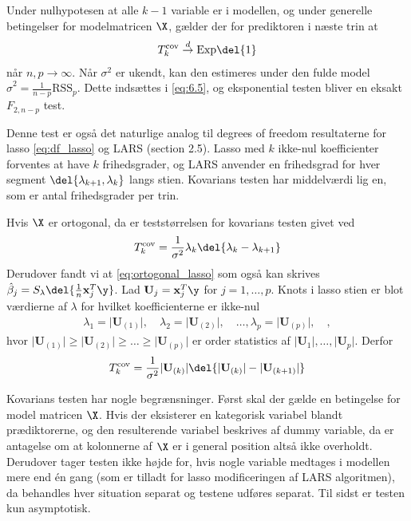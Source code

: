 Under nulhypotesen at alle $k-1$ variable er i modellen, og under generelle betingelser for modelmatricen $\X$, gælder der for prediktoren i næste trin at
\begin{align*}
T_k^\text{cov} \overset{d}{\rightarrow} \text{Exp}\del{1}
\end{align*}
når \(n, p \rightarrow \infty\).
Når \(\sigma^2\) er ukendt, kan den estimeres under den fulde model \(\hat{\sigma}^2 = \frac{1}{n-p} \text{RSS}_p\). 
Dette indsættes i \eqref{eq:6.5}, og eksponential testen bliver en eksakt \(F_{2,n-p}\) test.

Denne test er også det naturlige analog til degrees of freedom resultaterne for lasso \eqref{eq:df_lasso} og LARS (section 2.5).
Lasso med \(k\) ikke-nul koefficienter forventes at have \(k\) frihedsgrader, og LARS anvender en frihedsgrad for hver segment \(\del{\lambda_{k+1}, \lambda_k}\) langs stien.
Kovarians testen har middelværdi lig en, som er antal frihedsgrader per trin.


Hvis \(\X\) er ortogonal, da er teststørrelsen for kovarians testen givet ved
\begin{align*}
T_k^\text{cov} = \frac{1}{\sigma^2} \lambda_k \del{\lambda_k - \lambda_{k+1}}
\end{align*} 
Derudover fandt vi at \eqref{eq:ortogonal_lasso} som også kan skrives \(\hat{\beta}_j = S_\lambda \del{\frac{1}{n} \mathbf{x}_j^T \y}\).
Lad \(\mathbf{U}_j = \mathbf{x}_j^T \y\) for \(j=1,\ldots, p\). 
Knots i lasso stien er blot værdierne af \(\lambda\) for hvilket koefficienterne er ikke-nul
\begin{align*}
\lambda_1 = \vert \mathbf{U}_{(1)} \vert, \quad \lambda_2 = \vert \mathbf{U}_{(2)} \vert, \quad \ldots, \lambda_p = \vert \mathbf{U}_{(p)} \vert, \quad,
\end{align*}
hvor \(\vert \mathbf{U}_{(1)} \vert \geq \vert \mathbf{U}_{(2)} \vert \geq \dots \geq \vert \mathbf{U}_{(p)} \vert\) er order statistics af \(\vert \mathbf{U}_1 \vert, \ldots, \vert \mathbf{U}_p \vert\).
Derfor 
\begin{align*}
T_k^\text{cov} = \frac{1}{\sigma^2}  \vert \mathbf{U}_{(k)} \vert \del{ \vert \mathbf{U}_{(k)} \vert -  \vert \mathbf{U}_{(k+1)} \vert}
\end{align*}


Kovarians testen har nogle begrænsninger.
Først skal der gælde en betingelse for model matricen \(\X\).
Hvis der eksisterer en kategorisk variabel blandt prædiktorerne, og den resulterende variabel beskrives af dummy variable, da er antagelse om at kolonnerne af \(\X\) er i general position altså ikke overholdt.
Derudover tager testen ikke højde for, hvis nogle variable medtages i modellen mere end én gang (som er tilladt for lasso modificeringen af LARS algoritmen), da behandles hver situation separat og testene udføres separat.
Til sidst er testen kun asymptotisk.

